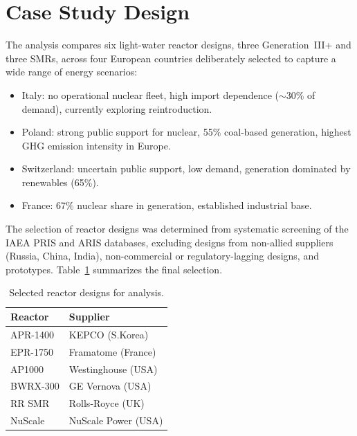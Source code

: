 \documentclass[11pt,a4paper,twocolumn]{article}
\begin{document}
\section{Case Study Design}
\label{sec:case_study}

The analysis compares six light-water reactor designs, three Generation~III+ and three SMRs, across four European countries deliberately selected to capture a wide range of energy scenarios:

\begin{itemize}
    \item {Italy}: no operational nuclear fleet, high import dependence ($\sim$30\% of demand), currently exploring reintroduction.
    \item {Poland}: strong public support for nuclear, 55\% coal-based generation, highest GHG emission intensity in Europe.
    \item {Switzerland}: uncertain public support, low demand, generation dominated by renewables (65\%).
    \item {France}: 67\% nuclear share in generation, established industrial base.
\end{itemize}

The selection of reactor designs was determined from systematic screening of the IAEA PRIS and ARIS databases, excluding designs from non-allied suppliers (Russia, China, India), non-commercial or regulatory-lagging designs, and prototypes. Table~\ref{tab:reactors} summarizes the final selection.

\begin{table}[H]
\centering
\caption{Selected reactor designs for analysis.}
\label{tab:reactors}
\begin{tabular}{ll}
\hline
\rowcolor{bluePoli!40}
{Reactor} & {Supplier} \T\B \\
\hline \hline
APR-1400 & KEPCO (S.Korea) \T\B \\
EPR-1750 & Framatome (France) \T\B \\
AP1000 & Westinghouse (USA) \T\B \\
BWRX-300 & GE Vernova (USA) \T\B \\
RR SMR & Rolls-Royce (UK) \T\B \\
NuScale & NuScale Power (USA) \B \\
\hline
\end{tabular}
\end{table}
\end{document}
